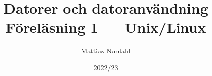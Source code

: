 \documentclass[trans]{beamer}
\author[]{Mattias Nordahl}
\institute{\url{mattias.nordahl@cs.lth.se}}
\date{}
\begin{document}
 

\title{Datorer och datoranvändning\\Föreläsning 1 --- Unix/Linux} 

\frame[plain]{
\maketitle

\vspace{-2\baselineskip}
}

\date{2022/23} 


\end{document}
